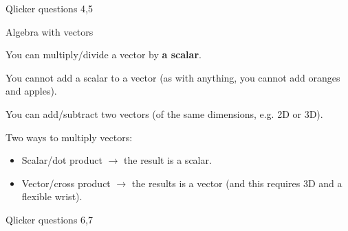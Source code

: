 \documentclass[aspectratio=169,
hyperref={colorlinks,urlcolor=blue}
]{beamer}
\begin{document}
\begin{frame}{Qlicker questions 4,5}

\end{frame}



\begin{bulletframe}{Algebra with vectors}
 \item You can multiply/divide a vector by \textbf{a scalar}.
 \item You cannot add a scalar to a vector (as with anything, you cannot add oranges and apples).
 \item You can add/subtract two vectors (of the same dimensions, e.g. 2D or 3D).
 \item Two ways to multiply vectors:
 \begin{itemize}
   \item Scalar/dot product $\rightarrow$ the result is a scalar.
 \item Vector/cross product $\rightarrow$ the results is a vector (and this requires 3D and a flexible wrist).
 \end{itemize}
\end{bulletframe}

\begin{frame}{Qlicker questions 6,7}

\end{frame}
\end{document}
